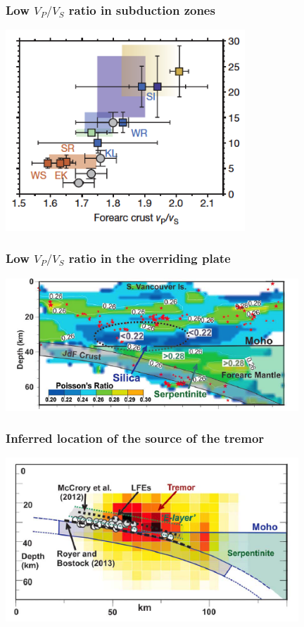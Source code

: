 \documentclass{beamer}
\begin{document}
	\begin{frame}
		\frametitle{Low $V_P / V_S$ ratio in subduction zones}
		\begin{center}
			\includegraphics[trim={0cm 0cm 0cm 0cm}, clip, width=9cm]{articles/audet_burgmann_2014_1c.png}
		\end{center}
	\end{frame}

	\begin{frame}
		\frametitle{Low $V_P / V_S$ ratio in the overriding plate}
		\begin{center}
			\includegraphics[trim={0cm 0cm 0cm 0cm}, clip, width=11cm]{articles/hyndmann_al_2015_8a.png}
		\end{center}
	\end{frame}

	\begin{frame}
		\frametitle{Inferred location of the source of the tremor}
		\begin{center}
			\includegraphics[trim={0cm 0cm 0cm 0cm}, clip, width=11cm]{articles/hyndmann_al_2015_8b.png}
		\end{center}
	\end{frame}
\end{document}
